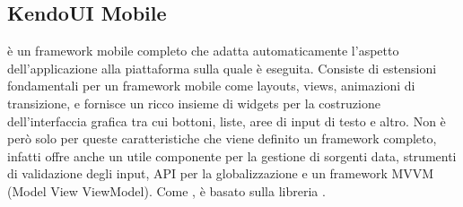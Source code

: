 		\subsection{KendoUI Mobile}
		\label{subsec:kendo}
			\kendomob{} è un framework mobile completo che adatta
			automaticamente	l'aspetto dell'applicazione alla piattaforma sulla
			quale è eseguita. Consiste di estensioni fondamentali per un
			framework mobile come layouts, views, animazioni di transizione,
			e fornisce un ricco insieme di widgets per la costruzione
			dell'interfaccia grafica tra cui bottoni, liste, aree di input di
			testo e altro. Non è però solo per queste caratteristiche che viene
			definito un framework completo, infatti \kendomob{} offre anche
			un utile componente per la gestione di sorgenti data, strumenti di
			validazione degli input, API per la globalizzazione e un framework
			MVVM (Model View ViewModel). Come \jqm{}, \kendomob{} è
			basato sulla libreria \js{} \jq{}.
			
